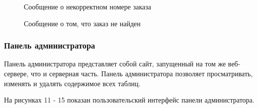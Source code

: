 \documentclass[a4paper]{article}
\begin{document}
				\begin{figure}[H]
					\centering
					\caption{Сообщение о некорректном номере заказа}
				\end{figure}
				
				\begin{figure}[H]
					\centering
					\caption{Сообщение о том, что заказ не найден}
				\end{figure}
			\subsubsection{Панель администратора}
				Панель администратора представляет собой сайт, запущенный на том же веб-сервере, что и серверная часть. Панель администратора позволяет просматривать, изменять и удалять содержимое всех таблиц.
				
				\bigskip
				
				На рисунках 11 - 15 показан пользовательский интерфейс панели администратора.
				
\end{document}

